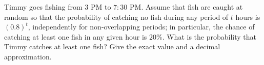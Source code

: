 Timmy goes fishing from $3$ PM to $7{:}30$ PM. Assume that fish are caught at random so that the probability of catching no fish during any period of $t$ hours is $(0.8)^t$, independently for non-overlapping periods; in particular, the chance of catching at least one fish in any given hour is $20\%$. What is the probability that Timmy catches at least one fish? Give the exact value and a decimal approximation.
